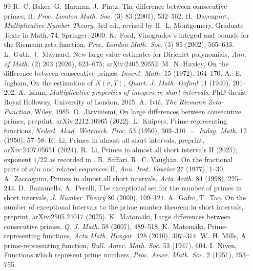 \documentclass[11pt,a4paper]{article}
\theoremstyle{definition}
\begin{document}
\begin{thebibliography}{99}\small
{} R.~C. Baker, G.~Harman, J.~Pintz, The difference between consecutive primes, II, \emph{Proc. London Math. Soc.} (3) 83 (2001), 532--562.
 H.~Davenport, \emph{Multiplicative Number Theory}, 3rd ed., revised by H.~L. Montgomery, Graduate Texts in Math. 74, Springer, 2000.
 K.~Ford, Vinogradov's integral and bounds for the Riemann zeta function, \emph{Proc. London Math. Soc.} (3) 85 (2002), 565--633.
 L.~Guth, J.~Maynard, New large value estimates for Dirichlet polynomials, \emph{Ann. of Math.} (2) 203 (2026), 623--675; arXiv:2405.20552.
 M.~N. Huxley, On the difference between consecutive primes, \emph{Invent. Math.} 15 (1972), 164--170.
 A.~E. Ingham, On the estimation of $N(\sigma,T)$, \emph{Quart. J. Math. Oxford} 11 (1940), 201--202.
 A.~Islam, \emph{Multiplicative properties of integers in short intervals}, PhD thesis, Royal Holloway, University of London, 2015.
 A.~Ivi\'c, \emph{The Riemann Zeta-Function}, Wiley, 1985.
 O.~Järviniemi, On large differences between consecutive primes, preprint, arXiv:2212.10965 (2022).
 L.~Kuipers, Prime-representing functions, \emph{Nederl. Akad. Wetensch. Proc.} 53 (1950), 309--310 $=$ \emph{Indag. Math.} 12 (1950), 57--58.
 R.~Li, Primes in almost all short intervals, preprint, arXiv:2407.05651 (2024).
 R.~Li, Primes in almost all short intervals II (2025); exponent $1/22$ as recorded in \cite{expdb}.
 B.~Saffari, R.~C. Vaughan, On the fractional parts of $x/n$ and related sequences II, \emph{Ann. Inst. Fourier} 27 (1977), 1--30.
 A.~Zaccagnini, Primes in almost all short intervals, \emph{Acta Arith.} 84 (1998), 225--244.
 D.~Bazzanella, A.~Perelli, The exceptional set for the number of primes in short intervals, \emph{J. Number Theory} 80 (2000), 109--124.
 A.~Gafni, T.~Tao, On the number of exceptional intervals to the prime number theorem in short intervals, preprint, arXiv:2505.24017 (2025).
 K.~Matomäki, Large differences between consecutive primes, \emph{Q. J. Math.} 58 (2007), 489--518.
 K.~Matomäki, Prime-representing functions, \emph{Acta Math. Hungar.} 128 (2010), 307--314.
 W.~H. Mills, A prime-representing function, \emph{Bull. Amer. Math. Soc.} 53 (1947), 604.
 I.~Niven, Functions which represent prime numbers, \emph{Proc. Amer. Math. Soc.} 2 (1951), 753--755.

\end{thebibliography}
\end{document}
